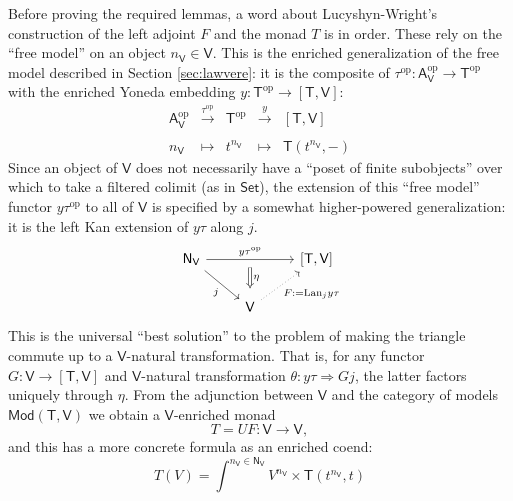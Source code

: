 \documentclass{amsart}
\theoremstyle{definition}
\newcommand{\Set}{\mathsf{Set}}
\newcommand{\Mod}{\mathsf{Mod}}
\newcommand{\NN}{\mathsf{N}}
\newcommand{\A}{\mathsf{A}}
\newcommand{\V}{\mathsf{V}}
\newcommand{\T}{\mathsf{T}}
\newcommand{\op}{\mathrm{op}}
\newcommand{\maps}{\colon}
\begin{document}
Before proving the required lemmas, a word about Lucyshyn-Wright's construction of the left adjoint $F$ and the monad $T$ is in order.  These rely on the ``free model'' on an object $n_\V \in \V$.   This is the enriched generalization of the free model described in Section \ref{sec:lawvere}: it is the composite of $\tau^\op\maps \A_\V^\op \to \T^\op$ with the enriched Yoneda embedding $y\maps \T^\op \to [\T,\V]$:
\[
\begin{array}{rllll}
\A_\V^\op & \xrightarrow{\tau^\op} & \T^\op & \xrightarrow{y} & \left[\T,\V\right]\\
\\
n_\V & \mapsto & t^{n_\V} & \mapsto & \T(t^{n_\V},-)
\end{array}
\]
Since an object of $\V$ does not necessarily have a ``poset of finite subobjects'' over which to take a filtered colimit (as in $\Set$), the extension of this ``free model'' functor $y \tau^\op$ to all of $\V$ is specified by a somewhat higher-powered generalization: it is the left Kan extension of $y\tau$ along $j$.
\[\begin{tikzcd}
\NN_\V \arrow[rr,"y\tau^\op"{name=y}] \arrow[swap,rd,"j"] & & \left[\T,\V\right]\\
& \V \arrow[swap,dotted, ru,"F:=\mathrm{Lan}_jy\tau"] \arrow[Rightarrow,from=y,"\eta", shorten >=0.2cm,shorten <=.2cm]
\end{tikzcd}\]
This is the universal ``best solution'' to the problem of making the triangle commute up to a $\V$-natural transformation.  That is, for any functor $G \maps \V \to [\T,\V]$ and $\V$-natural transformation $\theta \maps y\tau \Rightarrow Gj$, the latter factors uniquely through $\eta$.
From the adjunction between $\V$ and the category of models $\Mod(\T,\V)$ we obtain a $\V$-enriched monad
\[       T = U F \maps \V \to \V, \]
and this has a more concrete formula as an enriched coend:
\[
T(V) = \int^{n_\V\in \NN_\V} V^{n_\V} \times \T(t^{n_\V},t)
\]
\end{document}
